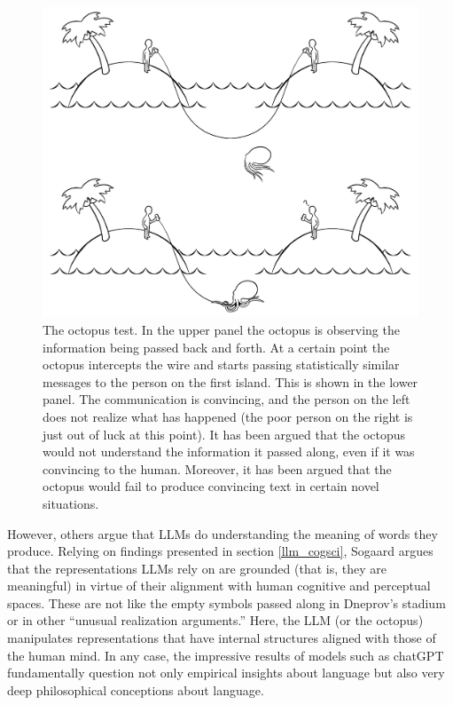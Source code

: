 \begin{figure}[h]
\centering
\includegraphics[scale=.20]{./images/octopusTest.png}
\caption[Soraya Boza.]{The octopus test. In the upper panel the octopus is observing the information being passed back and forth. At a certain point the octopus intercepts the wire and starts passing statistically similar messages to the person on the first island. This is shown in the lower panel. The communication is convincing, and the person on the left does not realize what has happened (the poor person on the right is just out of luck at this point). It has been argued that the octopus would not understand the information it passed along, even if it was convincing to the human. Moreover, it has been argued that the octopus would fail to produce convincing text in certain novel situations.}
\label{octopusTest}
\end{figure}

However, others argue that LLMs do understanding the meaning of words they produce. Relying on findings presented in section \ref{llm_cogsci}, Sogaard \cite{sogaard2023grounding} argues that the representations LLMs rely on are grounded (that is, they are meaningful) in virtue of their alignment with human cognitive and perceptual spaces. These are not like the empty symbols passed along in Dneprov's stadium or in other ``unusual realization arguments.'' Here, the LLM (or the octopus) manipulates representations that have internal structures aligned with those of the human mind. In any case, the impressive results of models such as chatGPT fundamentally question not only empirical insights about language but also very deep philosophical conceptions about language.

